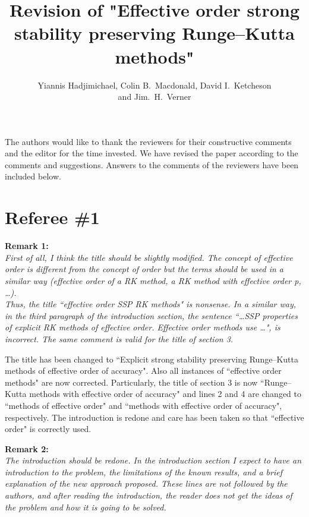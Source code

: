 \documentclass[12pt]{article}
\newcommand{\remark}[2]{\vspace{25pt} \noindent \textbf{Remark #1:\newline} \textit{#2}\vspace{15pt}}
\renewcommand{\newline}{\vspace{15pt}\\}
\begin{document}
\title{Revision of "Effective order strong stability preserving Runge--Kutta methods"}
\author{Yiannis Hadjimichael, Colin B.~Macdonald, David I.~Ketcheson \\ and  Jim.~H.~Verner}

\maketitle

The authors would like to thank the reviewers for their constructive comments and the
editor for the time invested. 
We have revised the paper according to the comments and suggestions. 
Answers to the comments of the reviewers have been included below.
\vspace{30pt}

\section*{Referee \#1}
\remark{1}
{First of all, I think the title should be slightly modified. 
The concept of \textit{effective order} is different from the concept of \textit{order} 
but the terms should be used in a similar way (\textit{effective order of a RK method, 
a RK method with effective order p, \dots}).
\newline
Thus, the title ``effective order SSP RK methods" is nonsense.
In a similar way, in the third paragraph of the introduction section, the sentence 
``\dots SSP properties of explicit RK methods of effective order. Effective order 
methods use \dots", is incorrect.
The same comment is valid for the title of section 3.}

The title has been changed to ``Explicit strong stability preserving Runge--Kutta methods
of effective order of accuracy". 
Also all instances of ``effective order methods" are now corrected.
Particularly, the title of section 3 is now ``Runge--Kutta methods with effective order 
of accuracy" and lines 2 and 4 are changed to ``methods of effective order" and
``methods with effective order of accuracy", respectively.
The introduction is redone and care has been taken so that ``effective order" 
is correctly used.

\remark{2}{
The introduction should be redone. 
In the introduction section I expect to have an introduction to the problem, the 
limitations of the known results, and a brief explanation of the new approach proposed. 
These lines are not followed by the authors, and after reading the introduction, the 
reader does not get the ideas of the problem and how it is going to be solved.}
\end{document}

